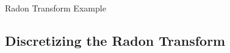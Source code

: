 \documentclass{beamer}
\begin{document}
\begin{frame}{Radon Transform Example}
	\hspace{-0.1\linewidth}
	\begin{minipage}[r]{0.5\linewidth}
		\begin{figure}[r]
			\centering
		\end{figure}    
	\end{minipage}
	\hspace{0.3cm}
	\begin{minipage}[c]{0.1\linewidth}
		\begin{figure}[c]
			\centering
		\end{figure}
	\end{minipage}
\end{frame}

\subsection{Discretizing the Radon Transform}
\end{document}
